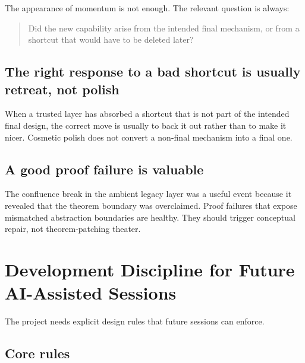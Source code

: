\documentclass[11pt]{article}
\begin{document}
The appearance of momentum is not enough. The relevant question is always:
\begin{quote}
Did the new capability arise from the intended final mechanism, or from a
shortcut that would have to be deleted later?
\end{quote}

\subsection{The right response to a bad shortcut is usually retreat, not polish}

When a trusted layer has absorbed a shortcut that is not part of the intended
final design, the correct move is usually to back it out rather than to make it
nicer. Cosmetic polish does not convert a non-final mechanism into a final one.

\subsection{A good proof failure is valuable}

The confluence break in the ambient legacy layer was a useful event because it
revealed that the theorem boundary was overclaimed. Proof failures that expose
mismatched abstraction boundaries are healthy. They should trigger conceptual
repair, not theorem-patching theater.

\section{Development Discipline for Future AI-Assisted Sessions}

The project needs explicit design rules that future sessions can enforce.

\subsection{Core rules}
\end{document}
